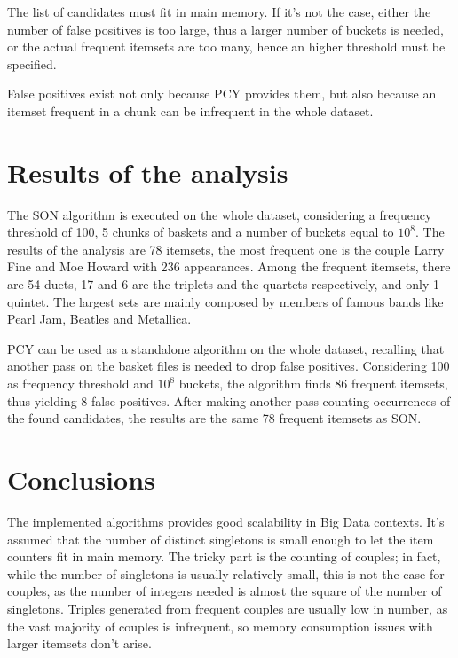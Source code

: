 \documentclass{article}
\begin{document}
The list of candidates must fit in main memory. If it's not the case, either the number of false positives is too large, thus a larger number of buckets is needed, or the actual frequent itemsets are too many, hence an higher threshold must be specified.

False positives exist not only because PCY provides them, but also because an itemset frequent in a chunk can be infrequent in the whole dataset. 

\section{Results of the analysis}

The SON algorithm is executed on the whole dataset, considering a frequency threshold of 100, 5 chunks of baskets and a number of buckets equal to $10^8$.
The results of the analysis are 78 itemsets, the most frequent one is the couple Larry Fine and Moe Howard with 236 appearances. Among the frequent itemsets, there are 54 duets, 17 and 6 are the triplets and the quartets respectively, and only 1 quintet. The largest sets are mainly composed by members of famous bands like Pearl Jam, Beatles and Metallica.

PCY can be used as a standalone algorithm on the whole dataset, recalling that another pass on the basket files is needed to drop false positives. Considering 100 as frequency threshold and $10^8$ buckets, the algorithm finds 86 frequent itemsets, thus yielding 8 false positives. After making another pass counting occurrences of the found candidates, the results are the same 78 frequent itemsets as SON.

\section{Conclusions}

The implemented algorithms provides good scalability in Big Data contexts. It's assumed that the number of distinct singletons is small enough to let the item counters fit in main memory. The tricky part is the counting of couples; in fact, while the number of singletons is usually relatively small, this is not the case for couples, as the number of integers needed is almost the square of the number of singletons. Triples generated from frequent couples are usually low in number, as the vast majority of couples is infrequent, so memory consumption issues with larger itemsets don't arise.
\end{document}
